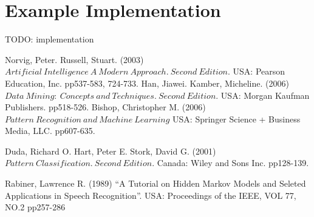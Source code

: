 \documentclass[11pt]{article}
\begin{document}
\section{Example Implementation}

TODO: implementation

\newpage

\begin{thebibliography}{99}

 Norvig, Peter. Russell, Stuart. (2003) $Artificial\ Intelligence\ A\ Modern\ Approach.\ Second\ Edition.$ USA: Pearson Education, Inc. pp537-583, 724-733.
 Han, Jiawei. Kamber, Micheline. (2006) $Data\ Mining:\ Concepts\ and\ Techniques.\ Second\ Edition.$ USA: Morgan Kaufman Publishers. pp518-526. 
 Bishop, Christopher M. (2006) $Pattern\ Recognition\ and\ Machine\ Learning$ USA: Springer Science + Business Media, LLC. pp607-635.

 Duda, Richard O. Hart, Peter E. Stork, David G. (2001) $Pattern\ Classification.\ Second\ Edition.$ Canada: Wiley and Sons Inc. pp128-139.

 Rabiner, Lawrence R. (1989) ``A Tutorial on Hidden Markov Models and Seleted Applications in Speech Recognition''. USA: Proceedings of the IEEE, VOL 77, NO.2 pp257-286

\end{thebibliography}
 
\end{document}
